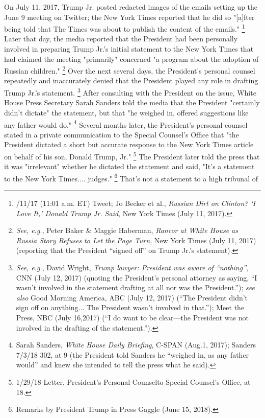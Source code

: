 {On July 11, 2017, Trump Jr. posted redacted images of the emails setting up the June 9 meeting on Twitter; the New York Times reported that he did so "[a]fter being told that The Times was about to publish the content of the emails."%
\footnote{/11/17 (11:01 a.m. ET) Tweet;
Jo Becker et al., \textit{Russian Dirt on Clinton? `I Love It,' Donald Trump Jr. Said}, New York Times (July 11, 2017).}
Later that day, the media reported that the President had been personally involved in preparing Trump Jr.'s initial statement to the New York Times that had claimed the meeting "primarily" concerned "a program about the adoption of Russian children."%
\footnote{\textit{See, e.g.}, Peter Baker \& Maggie Haberman, \textit{Rancor at White House as Russia Story Refuses to Let the Page Turn}, New York Times (July 11, 2017) (reporting that the President ``signed off'' on Trump Jr.'s statement).}
Over the next several days, the President's personal counsel repeatedly and inaccurately denied that the President played any role in drafting Trump Jr.'s statement.%
\footnote{\textit{See, e.g.}, David Wright, \textit{Trump lawyer: President was aware of “nothing”}, CNN (July 12, 2017) (quoting the President’s personal attorney as saying, “I wasn’t involved in the statement drafting at all nor was the President.”);
\textit{see also} Good Morning America, ABC (July 12, 2017) (“The President didn’t sign off on anything... The President wasn’t involved in that.”);
Meet the Press, NBC (July 16,2017) (“I do want to be clear—the President was not involved in the drafting of the statement.”).}
After consulting with the President on the issue, White House Press Secretary Sarah Sanders told the media that the President "certainly didn't dictate" the statement, but that "he weighed in, offered suggestions like any father would do."%
\footnote{Sarah Sanders, \textit{White House Daily Briefing}, C-SPAN (Aug.1, 2017);
Sanders 7/3/18 302, at 9 (the President told Sanders he “weighed in, as any father would” and knew she intended to tell the press what he said).}
Several months later, the President's personal counsel stated in a private communication to the Special Counsel's Office that "the President dictated a short but accurate response to the New York Times article on behalf of his son, Donald Trump,
Jr."%
\footnote{1/29/18 Letter, President’s Personal Counselto Special Counsel’s Office, at 18.}
The President later told the press that it was "irrelevant" whether he dictated the statement and said, "It's a statement to the New York Times.... judges."%
\footnote{Remarks by President Trump in Press Gaggle (June 15, 2018).}
That's not a statement to a high tribunal of

}
